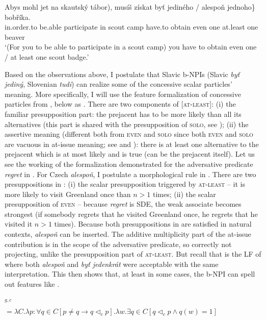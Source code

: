 \documentclass[output=paper,colorlinks,citecolor=brown]{langscibook}
\begin{document}
\newpage
\ea\label{ex:61}\gll \minsp{(} Abys mohl jet na skautský tábor), musíš získat \minsp{\{\#} byť jediného / alespoň jednoho\} bobříka.\\
{} in.order.to be.able participate in scout camp have.to obtain {} even one {} at.least one beaver\\
\glt `(For you to be able to participate in a scout camp) you have to obtain even one / at least one scout badge.'
\z


\noindent Based on the observations above, I postulate that Slavic b-NPIs (Slavic \emph{byť jediný}, Slovenian \emph{tudi}) can realize some of the concessive scalar particles' meaning. More specifically, I will use the feature formalization of concessive particles from \citet[109]{Crnic2011}, below as . There are two components of {[}\textsc{at-least}{]}: (i) the familiar presupposition part: the prejacent has to be more likely than all its alternatives (this part is shared with the presupposition of \textsc{solo}, see ); (ii) the assertive meaning (different both from \textsc{even} and \textsc{solo} since both \textsc{even} and \textsc{solo} are vacuous in at-issue meaning; see  and ): there is at least one alternative to the prejacent which is at most likely and is true (can be the prejacent itself). Let us see the working of the formalization demonstrated for the adversative predicate \emph{regret} in . For Czech \emph{alespoň}, I postulate a morphological rule in . There are two presuppositions in : (i) the scalar presupposition triggered by \textsc{at-least} -- it is more likely to visit Greenland once than \(n>1\) times; (ii) the scalar presupposition of \textsc{even} -- because \emph{regret} is SDE, the weak associate becomes strongest (if somebody regrets that he visited Greenland once, he regrets that he visited it \(n>1\) times). Because both presuppositions in  are satisfied in natural contexts, \emph{alespoň} can be inserted. The additive multiplicity part of the at-issue contribution is in the scope of the adversative predicate, so correctly not projecting, unlike the presupposition part of \textsc{at-least}. But recall that  is the LF of  where both \emph{alespoň} and \emph{byť jedenkrát} were acceptable with the same interpretation. This then shows that, at least in some cases, the b-NPI can spell out features like .

\ea\label{ex:62}$^{g,c}$\\${}=\lambda C.\lambda p:\forall q \in C[p \neq q \rightarrow q \triangleleft_c p]. \lambda w.\exists q\in C[q \triangleleft_c p \wedge q(w)=1]$\\\hfill \citet[109]{Crnic2011}
\z
\end{document}
